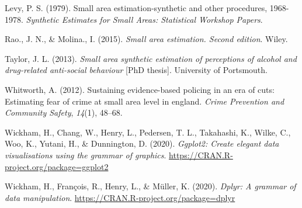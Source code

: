\documentclass[
]{article}
\begin{document}
\leavevmode\hypertarget{ref-levy1979}{}%
Levy, P. S. (1979). Small area estimation-synthetic and other
procedures, 1968-1978. \emph{Synthetic Estimates for Small Areas:
Statistical Workshop Papers}.

\leavevmode\hypertarget{ref-rao2015}{}%
Rao., J. N., \& Molina., I. (2015). \emph{Small area estimation. Second
edition}. Wiley.

\leavevmode\hypertarget{ref-taylor2013}{}%
Taylor, J. L. (2013). \emph{Small area synthetic estimation of
perceptions of alcohol and drug-related anti-social behaviour}
{[}PhD thesis{]}. University of Portsmouth.

\leavevmode\hypertarget{ref-whitworth2012}{}%
Whitworth, A. (2012). Sustaining evidence-based policing in an era of
cuts: Estimating fear of crime at small area level in england.
\emph{Crime Prevention and Community Safety}, \emph{14}(1), 48--68.

\leavevmode\hypertarget{ref-wickham2020b}{}%
Wickham, H., Chang, W., Henry, L., Pedersen, T. L., Takahashi, K.,
Wilke, C., Woo, K., Yutani, H., \& Dunnington, D. (2020). \emph{Ggplot2:
Create elegant data visualisations using the grammar of graphics}.
\url{https://CRAN.R-project.org/package=ggplot2}

\leavevmode\hypertarget{ref-wickham2020}{}%
Wickham, H., François, R., Henry, L., \& Müller, K. (2020). \emph{Dplyr:
A grammar of data manipulation}.
\url{https://CRAN.R-project.org/package=dplyr}
\end{document}
